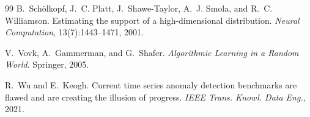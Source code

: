 \documentclass[twocolumn,10pt]{article}
\begin{document}
\begin{thebibliography}{99}
B.~Sch\"olkopf, J.~C. Platt, J.~Shawe-Taylor, A.~J. Smola, and R.~C.
  Williamson.
\newblock Estimating the support of a high-dimensional distribution.
\newblock \emph{Neural Computation}, 13(7):1443--1471, 2001.

V.~Vovk, A.~Gammerman, and G.~Shafer.
\newblock \emph{Algorithmic Learning in a Random World}.
\newblock Springer, 2005.

R.~Wu and E.~Keogh.
\newblock Current time series anomaly detection benchmarks are flawed and are
  creating the illusion of progress.
\newblock \emph{IEEE Trans. Knowl. Data Eng.}, 2021.

\end{thebibliography}
\end{document}
